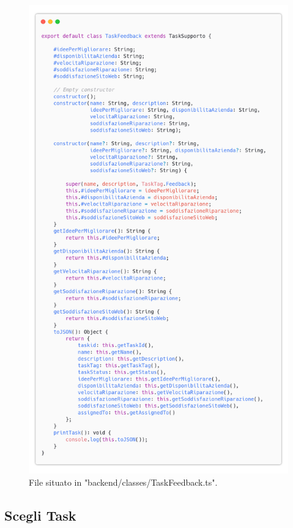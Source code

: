 \documentclass{report}
\begin{document}
\begin{figure}[H]
	\centering\includegraphics[width=1\textwidth]{images/code_task_feedback.png}
	File situato in "backend/classes/TaskFeedback.ts".
\end{figure}




\subsection*{Scegli Task}
\end{document}
